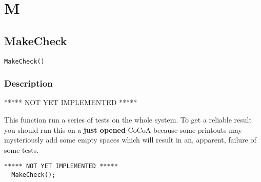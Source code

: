\documentclass[a4paper]{mybook}
\newenvironment{command}{}{} %
\begin{document}
\chapter{M}  %
\label{M}

\section{MakeCheck}
\label{MakeCheck}
\begin{command} %


\begin{Verbatim}[label=syntax, rulecolor=\color{MidnightBlue},
frame=single]
MakeCheck()
\end{Verbatim}


\subsection*{Description}

***** NOT YET IMPLEMENTED *****
\par 
This function run a series of tests on the whole system.  To get a
reliable result you should run this on a \textbf{just opened} CoCoA
because some printouts may mysteriously add some empty spaces which
will result in an, apparent, failure of some tests.
\begin{Verbatim}[label=example, rulecolor=\color{PineGreen}, frame=single]
***** NOT YET IMPLEMENTED *****
  MakeCheck();
\end{Verbatim}


\end{command} %
\end{document}
